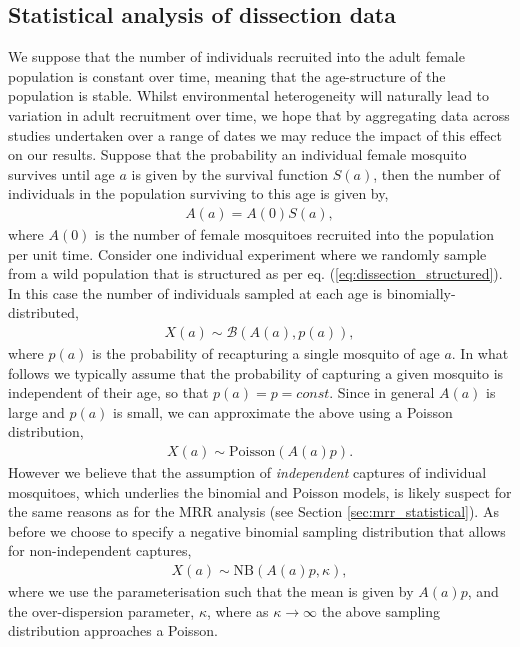 \documentclass[12pt]{article}
\begin{document}
{\subsection{Statistical analysis of dissection data}\label{sec:dissection_dissectionStats}
We suppose that the number of individuals recruited into the adult female population is constant over time, meaning that the age-structure of the population is stable. Whilst environmental heterogeneity will naturally lead to variation in adult recruitment over time, we hope that by aggregating data across studies undertaken over a range of dates we may reduce the impact of this effect on our results. Suppose that the probability an individual female mosquito survives until age $a$ is given by the survival function $S(a)$, then the number of individuals in the population surviving to this age is given by,
%
\begin{align}\label{eq:dissection_structured}
A(a) = A(0) S(a),
\end{align}
%
where $A(0)$ is the number of female mosquitoes recruited into the population per unit time. Consider one individual experiment where we randomly sample from a wild population that is structured as per eq. (\ref{eq:dissection_structured}). In this case the number of individuals sampled at each age is binomially-distributed,
%
\begin{align}
X(a) \sim \mathcal{B}(A(a),p(a)),
\end{align} 
%
where $p(a)$ is the probability of recapturing a single mosquito of age $a$. In what follows we typically assume that the probability of capturing a given mosquito is independent of their age, so that $p(a)=p=const$. Since in general $A(a)$ is large and $p(a)$ is small, we can approximate the above using a Poisson distribution,
%
\begin{align}
X(a) \sim \text{Poisson}(A(a)p).
\end{align}
%
However we believe that the assumption of \textit{independent} captures of individual mosquitoes, which underlies the binomial and Poisson models, is likely suspect for the same reasons as for the MRR analysis (see Section \ref{sec:mrr_statistical}). As before we choose to specify a negative binomial sampling distribution that allows for non-independent captures,
%
\begin{align}
X(a) \sim \text{NB}(A(a)p,\kappa),
\end{align} 
%
where we use the parameterisation such that the mean is given by $A(a)p$, and the over-dispersion parameter, $\kappa$, where as $\kappa\rightarrow \infty$ the above sampling distribution approaches a Poisson.

}
\end{document}
